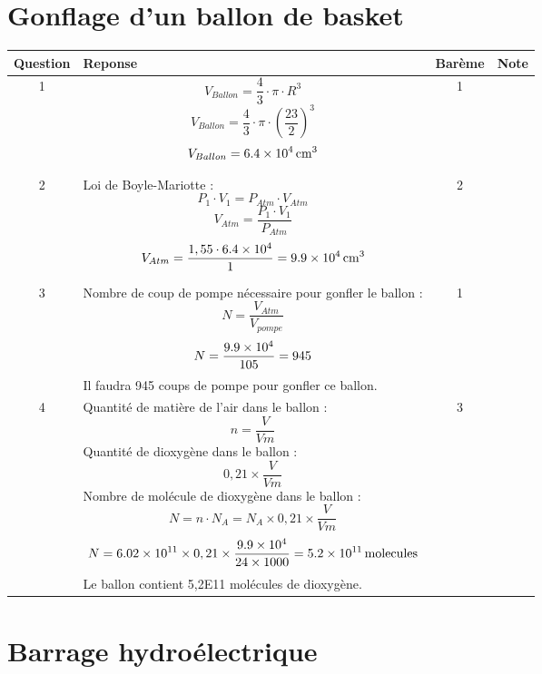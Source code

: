 \documentclass[a4paper,11pt,fleqn]{article}%
\begin{document}
\maketitle

\section{Gonflage d'un ballon de basket}

\begin{tabular}{|c|m{.7\linewidth}|c|c|}
    \hline
    Question & Reponse & Barème & Note\\
    \hline
    1 & $$V_{Ballon} = \dfrac{4}{3} \cdot \pi \cdot R^3$$
    $$V_{Ballon} = \dfrac{4}{3} \cdot \pi \cdot \left(\dfrac{23}{2}\right)^3$$
    $$V_{Ballon} =\SI{6,4E4}{\centi\meter\cubed}$$
    & 1 & \\
    \hline
    
    2 & Loi de Boyle-Mariotte : $$P_1 \cdot V_1 = P_{Atm} \cdot V_{Atm}$$
    $$ V_{Atm} = \dfrac{P_1 \cdot V_1}{P_{Atm}}$$
    $$ V_{Atm} = \dfrac{1,55 \cdot \num{6,4E4}}{1} = \SI{9,9E4}{\centi\meter\cubed}$$
    & 2 & \\
    \hline

    3 & Nombre de coup de pompe nécessaire pour gonfler le ballon : $$ N = \dfrac{V_{Atm}}{V_{pompe}}$$
    $$N = \dfrac{\num{9,9E4}}{105} = 945$$
    Il faudra \num{945} coups de pompe pour gonfler ce ballon.
    & 1 & \\
    \hline

    4 & Quantité de matière de l'air dans le ballon : $$ n = \dfrac{V}{Vm}$$ 
    Quantité de dioxygène dans le ballon : $$ 0,21 \times \dfrac{V}{Vm} $$
    Nombre de molécule de dioxygène dans le ballon : $$ N = n \cdot N_A = N_A \times 0,21 \times \dfrac{V}{Vm}$$
    $$N = \num{6,02E11} \times 0,21 \times \dfrac{\num{9,9E4}}{24\times 1000} =\SI{5,2E11}{molecules} $$
    Le ballon contient \num{5,2E11} molécules de dioxygène.
    & 3 & \\
    \hline
\end{tabular}


\section{Barrage hydroélectrique}
\end{document}
